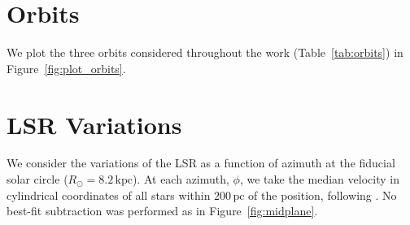 \documentclass[twocolumn]{aastex62}
\newcommand{\pc}{\text{pc}}
\newcommand{\kpc}{\text{kpc}}
\begin{document}
\appendix
\section{Orbits} \label{app:orbits}
We plot the three orbits considered throughout the work
(Table~\ref{tab:orbits}) in Figure~\ref{fig:plot_orbits}.

\begin{figure*}
\caption{The three orbits presented in Table~\ref{tab:orbits} and considered
throughout the work. We plot the thin, thick, and halo orbits in the {\em
left}, {\em center}, and {\em right} columns, respectively. The {\em upper}
row shows a plot of $x$ vs. $y$ while the {\em lower} row shows $R$ vs. $z$.}
\label{fig:plot_orbits}
\end{figure*}

\section{LSR Variations} \label{app:lsr}
We consider the variations of the LSR as a function of azimuth at the fiducial
solar circle ($R_{\odot} = 8.2\,\kpc$). At each azimuth, $\phi$, we take the
median velocity in cylindrical coordinates of all stars within $200\,\pc$ of
the position, following \citet{2018arXiv180610564S}. No best-fit subtraction
was performed as in Figure~\ref{fig:midplane}.

\begin{figure*}
\caption{The local standard of rest (LSR) as a function of azimuth at the
fiducial Solar circle ($R_{\odot} = 8.2\,\kpc$). No best-fit subtraction is
performed here as we did in the case of the midplane
(Section~\ref{ssec:local_midplane}).}
\end{figure*}


\end{document}
